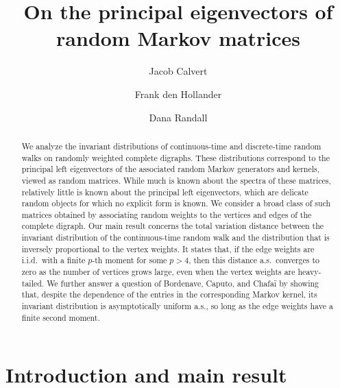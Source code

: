 \documentclass[12pt]{amsart}
\title{On the principal eigenvectors of random Markov matrices}
\author{Jacob Calvert}
\author{Frank den Hollander}
\author{Dana Randall}
\DeclareMathOperator{\1}{\mathbf{1}}
\begin{document}
\begin{abstract}
We analyze the invariant distributions of continuous-time and discrete-time random walks on randomly weighted complete digraphs. These distributions correspond to the principal left eigenvectors of the associated random Markov generators and kernels, viewed as random matrices. While much is known about the spectra of these matrices, relatively little is known about the principal left eigenvectors, which are delicate random objects for which no explicit form is known. We consider a broad class of such matrices obtained by associating random weights to the vertices and edges of the complete digraph. Our main result concerns the total variation distance between the invariant distribution of the continuous-time random walk and the distribution that is inversely proportional to the vertex weights. It states that, if the edge weights are i.i.d.\ with a finite $p$-th moment for some $p>4$, then this distance a.s.\ converges to zero as the number of vertices grows large, even when the vertex weights are heavy-tailed. We further answer a question of Bordenave, Caputo, and Chafa{\"i} by showing that, despite the dependence of the entries in the corresponding Markov kernel, its invariant distribution is asymptotically uniform a.s., so long as the edge weights have a finite second moment.
\end{abstract}

\maketitle


\section{Introduction and main result}
\end{document}
